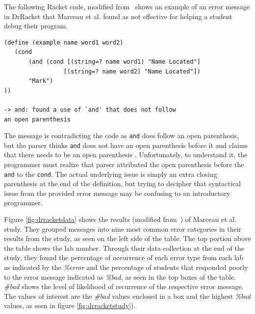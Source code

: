 \documentclass{sig-alternate}
\begin{document}
The following Racket code, modified from~\cite{Marceau:2011:MEE:1953163.1953308}  shows an example of an error message in DrRacket that Marceau et al. found as not effective for helping a student debug their program.

\begin{verbatim}
(define (example name word1 word2)
   (cond
  	   (and (cond [(string=? name word1) "Name Located"]
                 [(string=? name word2) "Name Located"])
       "Mark")
))

-> and: found a use of `and' that does not follow 
an open parenthesis
\end{verbatim}

The message is contradicting the code as \texttt{and} does follow an open parenthesis, but the parser thinks \texttt{and} does not have an open parenthesis before it and claims that there needs to be an open parenthesis .
Unfortunately, to understand it, the programmer must realize that parser attributed the open parenthesis before the \texttt{and} to the \texttt{cond}.
The actual underlying issue is simply an extra closing parenthesis at the end of the definition, but trying to decipher that syntactical issue from the provided error message may be confusing to an introductory programmer.



Figure \ref{fig:drracketdata} shows the results (modified from~\cite{Marceau:2011:MEE:1953163.1953308}) of Marceau et al. study. 
They grouped messages into nine most common error categories in their results from the study, as seen on the left side of the table.
The top portion above the table shows the lab number.
Through their data collection at the end of the study, they found the percentage of occurrence of each error type from each lab as indicated by the \textit{\%error} and the percentage of students that responded poorly to the error message indicated as \textit{\%bad}, as seen in the top boxes of the table.
\textit{\#bad} shows the level of likelihood of recurrence of the respective error message.
The values of interest are the \textit{\#bad} values enclosed in a box and the highest \textit{\%bad} values, as seen in figure \ref{fig:drracketstudy}). 
\end{document}
